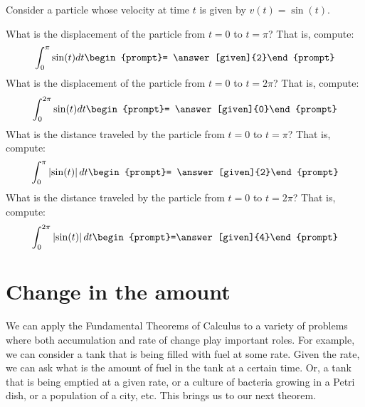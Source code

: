\documentclass{ximera}
\begin{document}
\begin{question}
  Consider a particle whose velocity at time $t$ is given by $v(t) = \sin(t)$.

\begin{image}
\end{image}
What is the displacement of the particle from $t=0$ to $t=\pi$? That
is, compute:
\[
\int_0^\pi \sin(t) dt \begin{prompt}= \answer[given]{2}\end{prompt}
\]
What is the displacement of the particle from $t=0$ to $t=2\pi$? That is, compute:
\[
\int_0^{2\pi} \sin(t) dt \begin{prompt}= \answer[given]{0}\end{prompt}
\]
What is the distance traveled by the particle from $t=0$ to $t=\pi$?
That is, compute:
\[
\int_0^\pi  \left| \sin(t) \right|  dt \begin{prompt}= \answer[given]{2}\end{prompt}
\]
What is the distance traveled by the particle from $t=0$ to $t=2\pi$?
That is, compute:
\[
\int_0^{2\pi} \left| \sin(t) \right| dt \begin{prompt}=\answer[given]{4}\end{prompt}
\]
\end{question}

\section{ Change in the  amount }

We can apply the Fundamental Theorems of Calculus to a variety of problems where both accumulation and rate of change play important roles.
For example, we can consider a tank that is being filled with fuel at some rate. Given the rate, we can ask what is the amount of fuel in the tank  at a  certain time.
Or, a tank that is being emptied at a given rate, or  a culture of bacteria growing in a Petri dish, or a  population of a city, etc.
This brings us to our next theorem.
\end{document}
